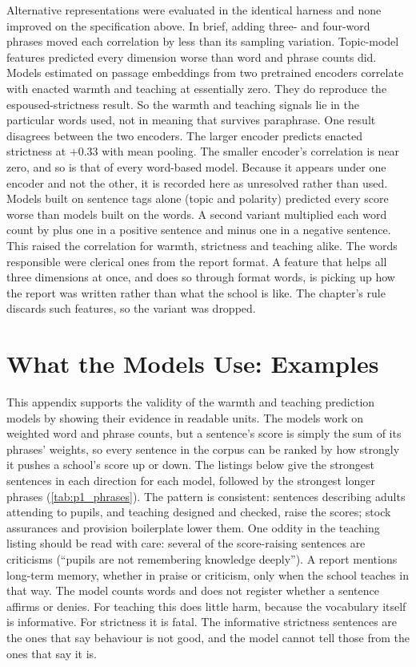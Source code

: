Alternative representations were evaluated in the identical harness and none improved on the specification above. In brief, adding three- and four-word phrases moved each correlation by less than its sampling variation. Topic-model features predicted every dimension worse than word and phrase counts did. Models estimated on passage embeddings from two pretrained encoders correlate with enacted warmth and teaching at essentially zero. They do reproduce the espoused-strictness result. So the warmth and teaching signals lie in the particular words used, not in meaning that survives paraphrase. One result disagrees between the two encoders. The larger encoder predicts enacted strictness at $+0.33$ with mean pooling. The smaller encoder's correlation is near zero, and so is that of every word-based model. Because it appears under one encoder and not the other, it is recorded here as unresolved rather than used.
Models built on sentence tags alone (topic and polarity) predicted every score worse than models built on the words. A second variant multiplied each word count by plus one in a positive sentence and minus one in a negative sentence. This raised the correlation for warmth, strictness and teaching alike. The words responsible were clerical ones from the report format. A feature that helps all three dimensions at once, and does so through format words, is picking up how the report was written rather than what the school is like. The chapter's rule discards such features, so the variant was dropped.

\section{What the Models Use: Examples}
\label{sec:p1_app_examples}

This appendix supports the validity of the warmth and teaching prediction
models by showing their evidence in readable units. The models work on
weighted word and phrase counts, but a sentence's score is simply the sum
of its phrases' weights, so every sentence in the corpus can be ranked by
how strongly it pushes a school's score up or down. The listings below
give the strongest sentences in each direction for each model, followed by the strongest longer phrases (\cref{tab:p1_phrases}). The pattern is consistent: sentences
describing adults attending to pupils, and teaching designed and checked,
raise the scores; stock assurances and provision boilerplate lower them.
One oddity in the teaching listing should be read with care: several of
the score-raising sentences are criticisms (``pupils are not remembering
knowledge deeply''). A report mentions long-term memory, whether in praise or criticism, only when the school teaches in that way. The model counts words and does not register whether a sentence affirms or denies. For teaching this does little harm, because the vocabulary itself is informative. For strictness it is fatal. The informative strictness sentences are the ones that say behaviour is not good, and the model cannot tell those from the ones that say it is.

